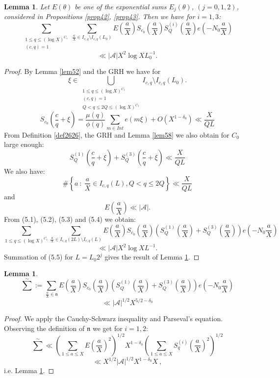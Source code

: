 \documentclass{amsart}
\newtheorem{lemma}[theorem]{Lemma}
\numberwithin{equation}{subsection}
\begin{document}
\begin{lemma}\label{lem513*}
Let $E(\theta)$ be one of the exponential sums $E_j(\theta)$, $(j=0, 1, 2)$, considered in Propositions \ref{prop42}, \ref{prop43}. Then we have for $i=1, 3$:
$$\sum_{\substack{1\leq q\leq (\log X)^{C_1} \\ (c,q)=1 }} \sum_{\frac{a}{X}\in I_{c,q}\setminus I_{c,q}(L_0)} E\left(\frac{a}{X}\right) S_{c_0}\left(\frac{a}{X}\right) S_Q^{(i)}\left(\frac{a}{X}\right) e\left(-N_0\frac{a}{X}\right)$$
$$\ll |\mathcal{A}| X^2 \log X L_0^{-1}. $$
\end{lemma}
\begin{proof}
By Lemma \ref{lem52} and the GRH we have for
$$\xi\in \bigcup_{\substack{1\leq q\leq (\log X)^{C_1} \\ (c,q)=1 \\ Q<q\leq 2Q\leq (\log X)^{C_1}}} I_{c,q}\setminus I_{c,q}(L_0).$$
\[ 
S_{c_0}\left(\frac{c}{q}+\xi\right)=\frac{\mu(q)}{\phi(q)}\sum_{m\in Int} e(m\xi)+O(X^{1-\delta_0})\ll \frac{X}{QL}  \tag{5.1}
\]
From Definition \ref{def2626}, the GRH and Lemma \ref{lem58} we also obtain for $C_0$ large enough:
\[
S_Q^{(1)}\left(\frac{c}{q}+\xi\right)+S_Q^{(3)}\left(\frac{c}{q}+\xi\right) \ll \frac{X}{QL} \tag{5.2}
\]
We also have:
\[
\# \left\{ a\::\: \frac{a}{X}\in I_{c,q}(L), Q<q\leq 2Q \right\} \ll \frac{X}{QL}\tag{5.3}
\]
and 
\[
E\left(\frac{a}{X}\right) \ll |\mathcal{A}|. \tag{5.4}
\]
From (5.1), (5.2), (5.3) and (5.4) we obtain:
\[
\sum_{1\leq q\leq (\log X)^{C_1}}\sum_{\frac{a}{X}\in I_{c,q}(2L)\setminus I_{c,q}(L)} E\left(\frac{a}{X}\right) S_{c_0}\left(\frac{a}{X}\right) \left( S_Q^{(1)}\left(\frac{a}{X}\right) +  S_Q^{(3)}\left(\frac{a}{X}\right) \right) e\left(-N_0\frac{a}{X}\right)\tag{5.5}
\]
$$ \ll |\mathcal{A}| X^2 \log X L^{-1}. $$
Summation of (5.5) for $L=L_0 2^j$ gives the result of Lemma \ref{lem513*}.
\end{proof}

\begin{lemma}\label{lem514*}
$$\sum^{\sim}:=\sum_{\frac{a}{X}\in\mathfrak{n}} E\left(\frac{a}{X}\right) S_{c_0}\left(\frac{a}{X}\right)\left( S_Q^{(1)}\left(\frac{a}{X}\right) +  S_Q^{(3)}\left(\frac{a}{X}\right) \right) e\left(-N_0\frac{a}{X}\right) $$
$$\ll |\mathcal{A}|^{1/2} X^{5/2-\delta_0}$$
\end{lemma}
\begin{proof}
We apply the Cauchy-Schwarz inequality and Parseval's equation. Observing the definition of $\mathfrak{n}$ we get for $i=1,2$:
$$\sum^{\sim} \ll \left(\sum_{1\leq a\leq X} E\left(\frac{a}{X}\right)^2\right)^{1/2} X^{1-\delta_0}\left(\sum_{1\leq a \leq X} S_q^{(i)}\left(\frac{a}{X}\right)^2\right)^{1/2}$$ 
$$\ll X^{1/2} |\mathcal{A}|^{1/2} X^{1-\delta_0} X\:,$$
i.e. Lemma \ref{lem514*}.
\end{proof}
\end{document}
